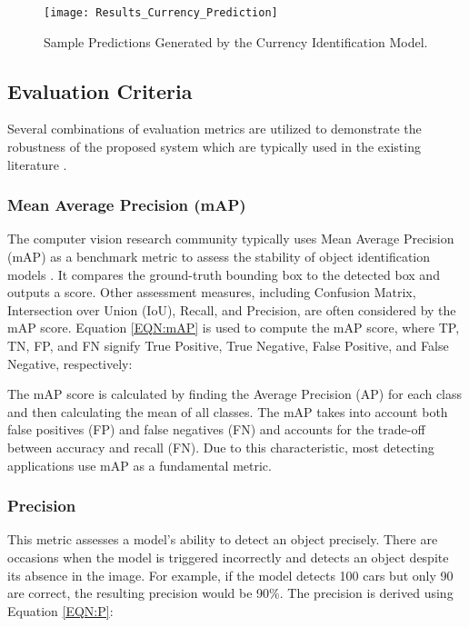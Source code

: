 \documentclass[journal,12pt,onecolumn,letterpaper]{IEEEtran}
\begin{document}
\begin{figure*} [htbp]
\centering
	\texttt{[image: Results\_Currency\_Prediction]}
\caption{Sample Predictions Generated by the Currency Identification Model.}
\label{FIG:Results_Currency_Prediction}
\end{figure*}


\subsection{Evaluation Criteria}

Several combinations of evaluation metrics are utilized to demonstrate the robustness of the proposed system which are typically used in the existing literature \cite{Joshi_TCE_2020, Sayeed_TCE_2019}.

\subsubsection{Mean Average Precision (mAP)}
The computer vision research community typically uses Mean Average Precision (mAP) as a benchmark metric to assess the stability of object identification models \cite{henderson_end--end_2017}. It compares the ground-truth bounding box to the detected box and outputs a score. Other assessment measures, including Confusion Matrix, Intersection over Union (IoU), Recall, and Precision, are often considered by the mAP score. Equation \ref{EQN:mAP} is used to compute the mAP score, where TP, TN, FP, and FN signify True Positive, True Negative, False Positive, and False Negative, respectively:


The mAP score is calculated by finding the Average Precision (AP) for each class and then calculating the mean of all classes. The mAP takes into account both false positives (FP) and false negatives (FN) and accounts for the trade-off between accuracy and recall (FN). Due to this characteristic, most detecting applications use mAP as a fundamental metric.

\subsubsection{Precision}
This metric assesses a model's ability to detect an object precisely. There are occasions when the model is triggered incorrectly and detects an object despite its absence in the image. For example, if the model detects 100 cars but only 90 are correct, the resulting precision would be 90\%. The precision is derived using Equation \ref{EQN:P}:
\end{document}
